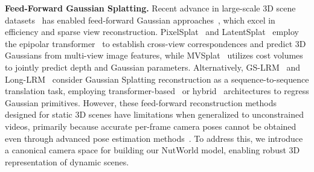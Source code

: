 \noindent\textbf{Feed-Forward Gaussian Splatting.} Recent advance in large-scale 3D scene datasets~\cite{ling2024dl3dv, zhou2018stereo, liu2021infinite} has enabled feed-forward Gaussian approaches~\cite{pixelsplat, chen2025mvsplat, zhang2024transplat, zhang2025gs, wewer2024latentsplat,yi2024mvgamba,shen2024gamba}, which excel in efficiency and sparse view reconstruction. PixelSplat~\cite{pixelsplat} and LatentSplat~\cite{wewer2024latentsplat} employ the epipolar transformer~\cite{he2020epipolar, wang2022mvster} to establish cross-view correspondences and predict 3D Gaussians from multi-view image features, while MVSplat~\cite{chen2025mvsplat} utilizes cost volumes to jointly predict depth and Gaussian parameters. Alternatively, GS-LRM~\cite{zhang2025gs} and Long-LRM~\cite{ziwen2024long} consider Gaussian Splatting reconstruction as a sequence-to-sequence translation task, employing transformer-based~\cite{vaswani2017attention} or hybrid~\cite{mamba2} architectures to regress Gaussian primitives. 
%
However, these feed-forward reconstruction methods designed for static 3D scenes have limitations when generalized to unconstrained videos, primarily because accurate per-frame camera poses cannot be obtained even through advanced pose estimation methods~\cite{wang2024vggsfm, wang2024dust3r, zhang2024monst3r, mast3r}. To address this, we introduce a canonical camera space for building our NutWorld model, enabling robust 3D representation of dynamic scenes.

\label{sec:formatting}

